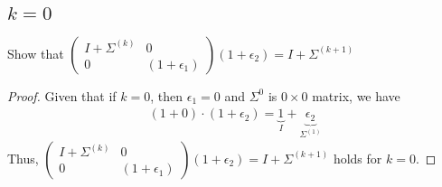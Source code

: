 \documentclass[11pt,a4paper]{article}
\begin{document}
\subsection{$k = 0$}
Show that $\left(\begin{array}{c|c} I+\Sigma^{(k)}&0\\\hline0&(1+\epsilon_1)\end{array}\right) (1+\epsilon_2)=I+\Sigma^{(k+1)}$
\begin{proof}
    Given that if $k=0$, then $\epsilon_1 = 0$ and $\Sigma^{0}$ is $0 \times 0$
    matrix, we have
    \begin{align}
        (1+0) \cdot (1+\epsilon_2) = \underbrace{1}_{I}+\underbrace{\epsilon_2}_{\Sigma^{(1)}}
    \end{align}
    Thus, 
    $\left(\begin{array}{c|c} I+\Sigma^{(k)}&0\\\hline0&(1+\epsilon_1)\end{array}\right) (1+\epsilon_2)=I+\Sigma^{(k+1)}$
    holds for $k=0$.
\end{proof}
\end{document}
